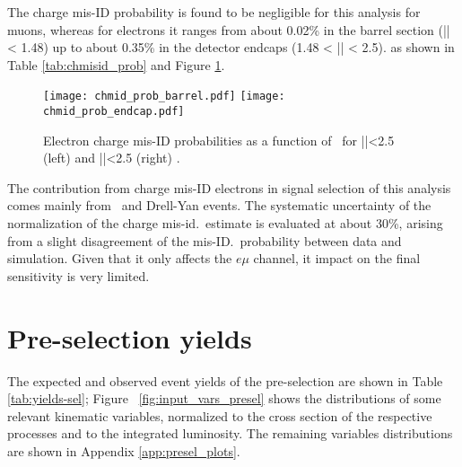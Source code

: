 The charge mis-ID probability is found to be negligible for this analysis for muons, whereas for
electrons it ranges from about 0.02\% in the barrel section (|\etac| < 1.48) up to about 0.35\% in the detector endcaps (1.48 < |\etac| < 2.5). as shown in Table \ref{tab:chmisid_prob} and Figure \ref{fig:chmisid_prob}.

\begin{figure}[htp]
\centering
\texttt{[image: chmid\_prob\_barrel.pdf]}
\texttt{[image: chmid\_prob\_endcap.pdf]}
\caption[Elecron mis-ID probabilities.]{Electron charge mis-ID probabilities as a function of \pt\ for |\etac|<2.5 (left) and |\etac|<2.5 (right) \cite{CMS_AN_2017-029}.}
\label{fig:chmisid_prob}
\end{figure}                            

The contribution from charge mis-ID electrons in signal selection of this analysis comes mainly from \ttbar\ and Drell-Yan events. The systematic uncertainty of the normalization of the charge mis-id.\ estimate is evaluated at about 30\%, arising from a slight disagreement of the mis-ID.\ probability between data and simulation. Given that it only affects the $e\mu$ channel, it impact on the final sensitivity is very limited.

\section{Pre-selection yields}

The expected and observed event yields of the pre-selection are shown in Table \ref{tab:yields-sel}; Figure ~\ref{fig:input_vars_presel} shows the distributions of some relevant kinematic variables, normalized to the cross section of the respective processes and to the integrated luminosity. The remaining variables distributions are shown in Appendix \ref{app:presel_plots}. 

